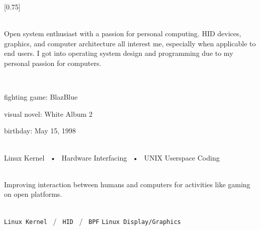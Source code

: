 \documentclass[lighthipster]{simplehipstercv}
\begin{document}
\setlength{\columnsep}{1.5cm}
[0.75]
\begin{paracol}{2}

\paracolbackgroundoptions



\footnotesize
{\setasidefontcolour
\flushright
\begin{center}
\end{center}

\\[0.5em]

{\footnotesize
Open system enthusiast with a passion for personal computing.
HID devices, graphics, and computer architecture all interest me,
especially when applicable to end users. I got into operating system
design and programming due to my personal passion for computers.
}
\bigskip

 \\[0.5em]




fighting game: BlazBlue

visual novel: White Album 2

birthday: May 15, 1998

\bigskip

 \\[0.5em]

Linux Kernel ~•~ Hardware Interfacing ~•~ UNIX Userspace Coding

\bigskip



\bigskip

\\[0.5em]

Improving interaction between humans and computers for activities like gaming on open platforms.
\bigskip

\\[0.5em]

\texttt{Linux Kernel} ~/~ \texttt{HID} ~/~ \texttt{BPF}
\texttt{Linux Display/Graphics}

}
\end{paracol}
\end{document}
